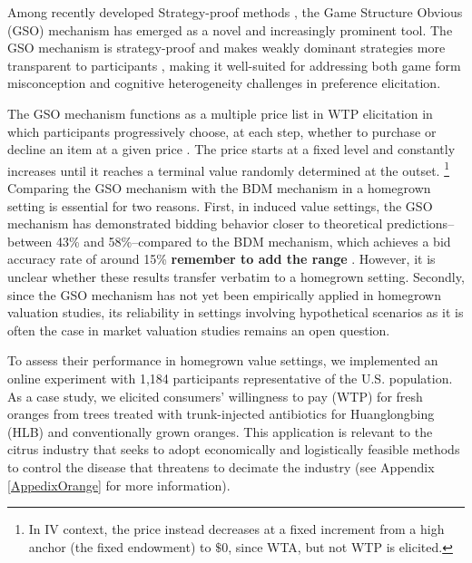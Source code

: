 \documentclass[12pt]{article}
\begin{document}
Among recently developed Strategy-proof methods \citep{li_obviously_2017, pycia_theory_2023}, the Game Structure Obvious (GSO) mechanism has emerged as a novel and increasingly prominent tool. The GSO mechanism is strategy-proof and makes weakly dominant strategies more transparent to participants \citep{chakraborty_future_2025}, making it well-suited for addressing both game form misconception and cognitive heterogeneity challenges in preference elicitation. 

The GSO mechanism functions as a multiple price list in WTP elicitation in which participants progressively choose, at each step, whether to purchase or decline an item at a given price \citep{yu2021multiple, herberich2012digging, jack2022multiple}. The price starts at a fixed level and constantly increases until it reaches a terminal value randomly determined at the outset. \footnote{In IV context, the price instead decreases at a fixed increment from a high anchor (the fixed endowment) to $\$0$,  since WTA, but not WTP is elicited.} Comparing the GSO mechanism with the BDM mechanism in a homegrown setting is essential for two reasons. First, in induced value settings, the GSO mechanism has demonstrated  bidding behavior closer to theoretical predictions--between 43\% and 58\%--compared to the BDM mechanism, which achieves a bid accuracy rate of around 15\% \textbf{remember to add the range} \citep{chakraborty_future_2025}. However, it is unclear whether these results transfer verbatim to a homegrown setting. Secondly, since the GSO mechanism has not yet been empirically applied in homegrown valuation studies, its reliability in settings involving hypothetical scenarios as it is often the case in market valuation studies remains an open question.

To assess their performance in homegrown value settings, we implemented an online experiment with 1,184 participants representative of the U.S. population. As a case study, we elicited consumers' willingness to pay (WTP) for fresh oranges from trees treated with trunk-injected antibiotics for Huanglongbing (HLB) and conventionally grown oranges. This application is relevant to the citrus industry that seeks to adopt economically and logistically feasible methods to control the disease that threatens to decimate the industry  (see Appendix \ref{AppedixOrange} for more information). 
\end{document}
